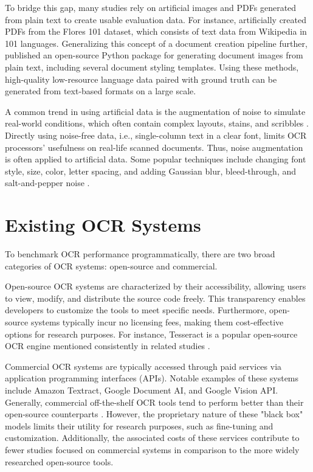 \documentclass[12pt,oneside]{memoir}
\begin{document}
To bridge this gap, many studies rely on artificial images and PDFs generated from plain text to create usable evaluation data.
For instance, \textcite{ignat-etal-2022} artificially created PDFs from the Flores 101 dataset, which consists of text data from Wikipedia in 101 languages.
Generalizing this concept of a document creation pipeline further, \textcite{gupte-etal-2021} published an open-source Python package for generating document images from plain text, including several document styling templates.
Using these methods, high-quality low-resource language data paired with ground truth can be generated from text-based formats on a large scale.

A common trend in using artificial data is the augmentation of noise to simulate real-world conditions, which often contain complex layouts, stains, and scribbles \parencite{hegghammer-2022}.
Directly using noise-free data, i.e., single-column text in a clear font, limits OCR processors' usefulness on real-life scanned documents.
Thus, noise augmentation is often applied to artificial data.
Some popular techniques include changing font style, size, color, letter spacing, and adding Gaussian blur, bleed-through, and salt-and-pepper noise \parencite{gupte-etal-2021, ignat-etal-2022}.

\section{Existing OCR Systems}
To benchmark OCR performance programmatically, there are two broad categories of OCR systems: open-source and commercial.

Open-source OCR systems are characterized by their accessibility, allowing users to view, modify, and distribute the source code freely.
This transparency enables developers to customize the tools to meet specific needs.
Furthermore, open-source systems typically incur no licensing fees, making them cost-effective options for research purposes.
For instance, Tesseract \parencite{smith-2013} is a popular open-source OCR engine mentioned consistently in related studies \parencite{hegghammer-2022, ignat-etal-2022}.

Commercial OCR systems are typically accessed through paid services via application programming interfaces (APIs).
Notable examples of these systems include Amazon Textract, Google Document AI, and Google Vision API.
Generally, commercial off-the-shelf OCR tools tend to perform better than their open-source counterparts \parencite{hegghammer-2022, ignat-etal-2022}.
However, the proprietary nature of these "black box" models limits their utility for research purposes, such as fine-tuning and customization.
Additionally, the associated costs of these services contribute to fewer studies focused on commercial systems in comparison to the more widely researched open-source tools.
\end{document}
